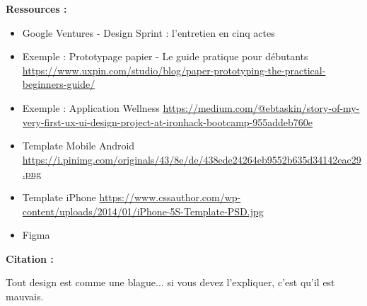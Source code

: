 \textbf{Ressources :}

\begin{itemize}
\item Google Ventures - Design Sprint : l'entretien en cinq actes
\item Exemple : Prototypage papier - Le guide pratique pour débutants \url{https://www.uxpin.com/studio/blog/paper-prototyping-the-practical-beginners-guide/}
\item Exemple : Application Wellness \url{https://medium.com/@ebtaskin/story-of-my-very-first-ux-ui-design-project-at-ironhack-bootcamp-955addeb760e}
\item Template Mobile Android \url{https://i.pinimg.com/originals/43/8e/de/438ede24264eb9552b635d34142eac29.png}
\item Template iPhone \url{https://www.cssauthor.com/wp-content/uploads/2014/01/iPhone-5S-Template-PSD.jpg}
\item Figma
\end{itemize}

\textbf{Citation :}

Tout design est comme une blague... si vous devez l'expliquer, c'est qu'il est mauvais.

